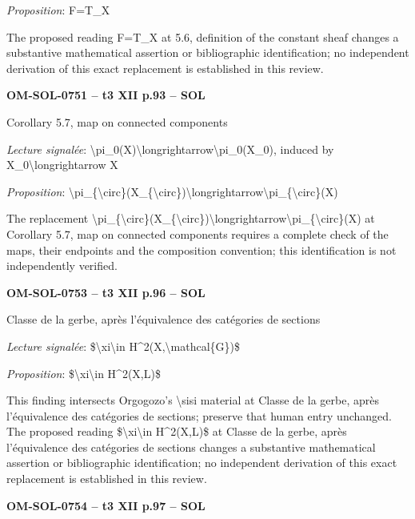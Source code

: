 \emph{Proposition}: F=\allowbreak T\_X\par
The proposed reading F=\allowbreak T\_X at 5.6, definition of the constant sheaf changes a substantive mathematical assertion or bibliographic identification; no independent derivation of this exact replacement is established in this review.\par
\par\noindent\textbf{OM-SOL-0751 -- t3 XII p.93 -- SOL}\par
Corollary 5.7, map on connected components\par
\emph{Lecture signalée}: \textbackslash{}pi\_0(X)\textbackslash{}longrightarrow\textbackslash{}pi\_0(X\_0), induced by X\_0\textbackslash{}longrightarrow X\par
\emph{Proposition}: \textbackslash{}pi\_\{\textbackslash{}circ\}(X\_\{\textbackslash{}circ\})\textbackslash{}longrightarrow\textbackslash{}pi\_\{\textbackslash{}circ\}(X)\par
The replacement \textbackslash{}pi\_\{\textbackslash{}circ\}(X\_\{\textbackslash{}circ\})\textbackslash{}longrightarrow\textbackslash{}pi\_\{\textbackslash{}circ\}(X) at Corollary 5.7, map on connected components requires a complete check of the maps, their endpoints and the composition convention; this identification is not independently verified.\par
\par\noindent\textbf{OM-SOL-0753 -- t3 XII p.96 -- SOL}\par
Classe de la gerbe, après l'équivalence des catégories de sections\par
\emph{Lecture signalée}: \$\textbackslash{}xi\textbackslash{}in H\textasciicircum{}2(X,\textbackslash{}mathcal\{G\})\$\par
\emph{Proposition}: \$\textbackslash{}xi\textbackslash{}in H\textasciicircum{}2(X,L)\$\par
This finding intersects Orgogozo's \textbackslash{}sisi material at Classe de la gerbe, après l'équivalence des catégories de sections; preserve that human entry unchanged. The proposed reading \$\textbackslash{}xi\textbackslash{}in H\textasciicircum{}2(X,L)\$ at Classe de la gerbe, après l'équivalence des catégories de sections changes a substantive mathematical assertion or bibliographic identification; no independent derivation of this exact replacement is established in this review.\par
\par\noindent\textbf{OM-SOL-0754 -- t3 XII p.97 -- SOL}\par
